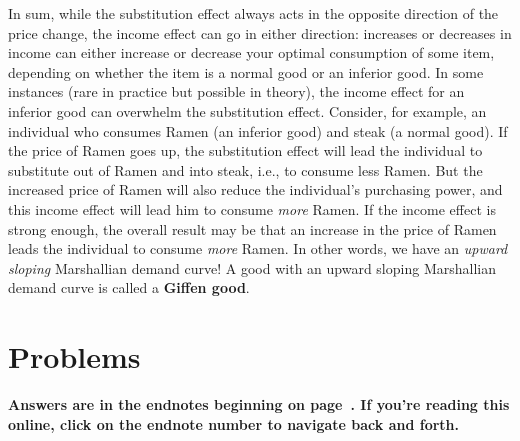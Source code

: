 
In sum, while the substitution effect always acts in the opposite direction of the price change, the income effect can go in either direction: increases or decreases in income can either increase or decrease your optimal consumption of some item, depending on whether the item is a normal good or an inferior good. In some instances (rare in practice but possible in theory), the income effect for an inferior good can overwhelm the substitution effect. Consider, for example, an individual who consumes Ramen (an inferior good) and steak (a normal good). If the price of Ramen goes up, the substitution effect will lead the individual to substitute out of Ramen and into steak, i.e., to consume less Ramen. But the increased price of Ramen will also reduce the individual's purchasing power, and this income effect will lead him to consume \emph{more} Ramen. If the income effect is strong enough, the overall result may be that an increase in the price of Ramen leads the individual to consume \emph{more} Ramen. In other words, we have an \emph{upward sloping} Marshallian demand curve! A good with an upward sloping Marshallian demand curve is called a \textbf{Giffen good}.

%
%
%



\bigskip
\bigskip
\section*{Problems}

\noindent \textbf{Answers are in the endnotes beginning on page~\pageref{3derivea}. If you're reading this online, click on the endnote number to navigate back and forth.}


\renewcommand\theenumi{\emph{C-}\arabic{chapter}.\arabic{enumi}}

